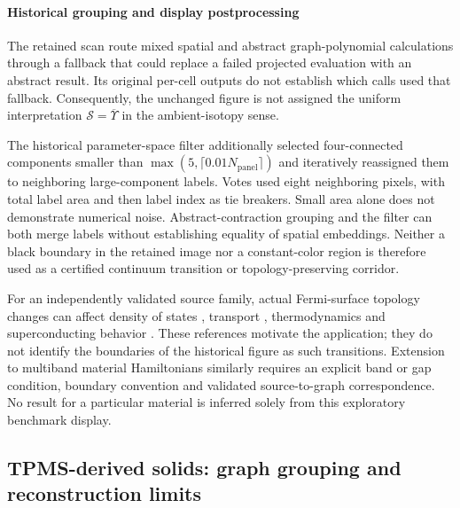 \documentclass[10pt,twocolumn]{article}
\begin{document}
\paragraph{Historical grouping and display postprocessing}
The retained scan route mixed spatial and abstract graph-polynomial calculations through a fallback that could replace a failed projected evaluation with an abstract result. Its original per-cell outputs do not establish which calls used that fallback. Consequently, the unchanged figure is not assigned the uniform interpretation $\mathcal S=\overline{\Upsilon}$ in the ambient-isotopy sense.

The historical parameter-space filter additionally selected four-connected components smaller than $\max(5,\lceil0.01N_{\mathrm{panel}}\rceil)$ and iteratively reassigned them to neighboring large-component labels. Votes used eight neighboring pixels, with total label area and then label index as tie breakers. Small area alone does not demonstrate numerical noise. Abstract-contraction grouping and the filter can both merge labels without establishing equality of spatial embeddings. Neither a black boundary in the retained image nor a constant-color region is therefore used as a certified continuum transition or topology-preserving corridor.

For an independently validated source family, actual Fermi-surface topology changes can affect density of states \cite{kg_galeski2022lifshitz,kg_ichinokura2022lifshitz}, transport \cite{kg_galeski2022lifshitz}, thermodynamics \cite{kg_slizovskiy2015lifshitz} and superconducting behavior \cite{kg_shi2017lifshitz}. These references motivate the application; they do not identify the boundaries of the historical figure as such transitions. Extension to multiband material Hamiltonians similarly requires an explicit band or gap condition, boundary convention and validated source-to-graph correspondence. No result for a particular material is inferred solely from this exploratory benchmark display.

\subsection{TPMS-derived solids: graph grouping and reconstruction limits}
\label{supp:tpms_phase_maps}
\label{sec:tpms_design_maps}
\end{document}
